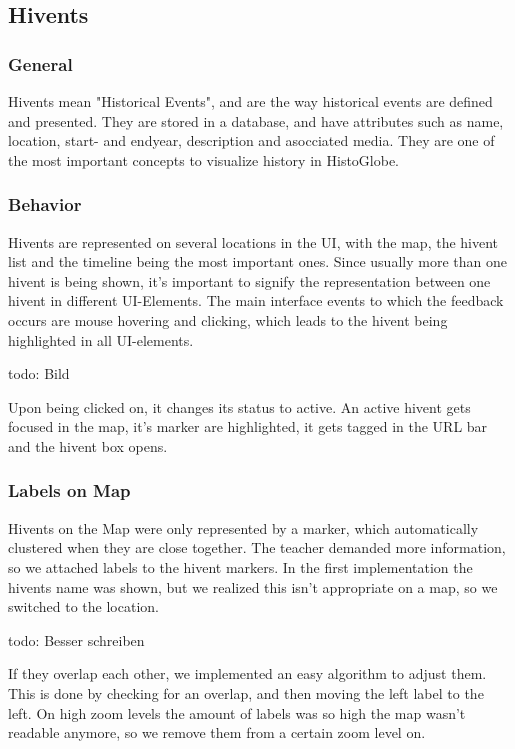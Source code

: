 \subsection{Hivents} %
\label{sec:hivents}
\subsubsection{General} %
\label{sub:general}
Hivents mean "Historical Events", and are the way historical events are defined and presented. They are stored in a database, and have attributes such as name, location, start- and endyear, description and asocciated media.
They are one of the most important concepts to visualize history in HistoGlobe.

\subsubsection{Behavior} %
\label{sub:behaviour}
Hivents are represented on several locations in the UI, with the map, the hivent list and the timeline being the most important ones.
Since usually more than one hivent is being shown, it's important to signify the representation between one hivent in different UI-Elements.
The main interface events to which the feedback occurs are mouse hovering and clicking, which leads to the hivent being highlighted in all UI-elements.

todo: Bild

Upon being clicked on, it changes its status to active. An active hivent gets focused in the map, it's marker are highlighted, it gets tagged in the URL bar and the hivent box opens.

\subsubsection{Labels on Map}
Hivents on the Map were only represented by a marker, which automatically clustered when they are close together.
The teacher demanded more information, so we attached labels to the hivent markers.
In the first implementation the hivents name was shown, but we realized this isn't appropriate on a map, so we switched to the location.

todo: Besser schreiben

If they overlap each other, we implemented an easy algorithm to adjust them. 
This is done by checking for an overlap, and then moving the left label to the left.
On high zoom levels the amount of labels was so high the map wasn't readable anymore, so we remove them from a certain zoom level on.



